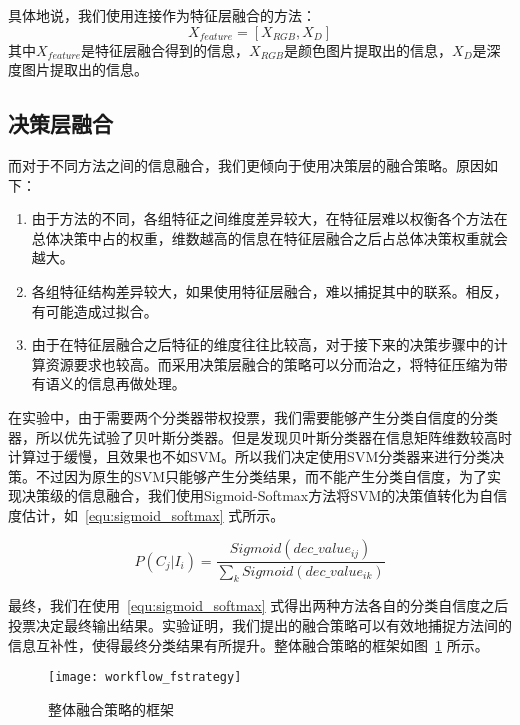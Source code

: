 具体地说，我们使用连接作为特征层融合的方法：
\begin{equation}
\label{equ:feature_level}
X_{feature} = [X_{RGB}, X_{D}]
\end{equation}
其中$X_{feature}$是特征层融合得到的信息，$X_{RGB}$是颜色图片提取出的信息，$X_{D}$是深度图片提取出的信息。

\subsection{决策层融合}
\label{subsec:fBetweenMethod}

而对于不同方法之间的信息融合，我们更倾向于使用决策层的融合策略。原因如下：
\begin{enumerate}
\item 由于方法的不同，各组特征之间维度差异较大，在特征层难以权衡各个方法在总体决策中占的权重，维数越高的信息在特征层融合之后占总体决策权重就会越大。
\item 各组特征结构差异较大，如果使用特征层融合，难以捕捉其中的联系。相反，有可能造成过拟合。
\item 由于在特征层融合之后特征的维度往往比较高，对于接下来的决策步骤中的计算资源要求也较高。而采用决策层融合的策略可以分而治之，将特征压缩为带有语义的信息再做处理。
\end{enumerate}

在实验中，由于需要两个分类器带权投票，我们需要能够产生分类自信度的分类器，所以优先试验了贝叶斯分类器。但是发现贝叶斯分类器在信息矩阵维数较高时计算过于缓慢，且效果也不如SVM。所以我们决定使用SVM分类器来进行分类决策。不过因为原生的SVM只能够产生分类结果，而不能产生分类自信度，为了实现决策级的信息融合，我们使用Sigmoid-Softmax方法将SVM的决策值转化为自信度估计，如~\ref{equ:sigmoid_softmax} 式所示。

\begin{equation}
\label{equ:sigmoid_softmax}
P(C_j|I_i) = \frac{Sigmoid(dec\_value_{ij})}{\underset{k}{\sum}{Sigmoid(dec\_value_{ik})}}
\end{equation}

最终，我们在使用~\ref{equ:sigmoid_softmax} 式得出两种方法各自的分类自信度之后投票决定最终输出结果。实验证明，我们提出的融合策略可以有效地捕捉方法间的信息互补性，使得最终分类结果有所提升。整体融合策略的框架如图~\ref{fig:workflow_fstrategy} 所示。

\begin{figure}[H] %
  \centering
  \texttt{[image: workflow\_fstrategy]}
  \caption{整体融合策略的框架}
  \label{fig:workflow_fstrategy}
\end{figure}

